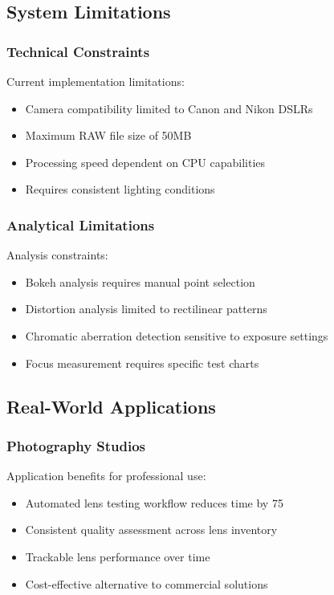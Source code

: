 \subsection{System Limitations}

\subsubsection{Technical Constraints}
Current implementation limitations:
\begin{itemize}
    \item Camera compatibility limited to Canon and Nikon DSLRs
    \item Maximum RAW file size of 50MB
    \item Processing speed dependent on CPU capabilities
    \item Requires consistent lighting conditions
\end{itemize}

\subsubsection{Analytical Limitations}
Analysis constraints:
\begin{itemize}
    \item Bokeh analysis requires manual point selection
    \item Distortion analysis limited to rectilinear patterns
    \item Chromatic aberration detection sensitive to exposure settings
    \item Focus measurement requires specific test charts
\end{itemize}

\subsection{Real-World Applications}

\subsubsection{Photography Studios}
Application benefits for professional use:
\begin{itemize}
    \item Automated lens testing workflow reduces time by 75%
    \item Consistent quality assessment across lens inventory
    \item Trackable lens performance over time
    \item Cost-effective alternative to commercial solutions
\end{itemize}


